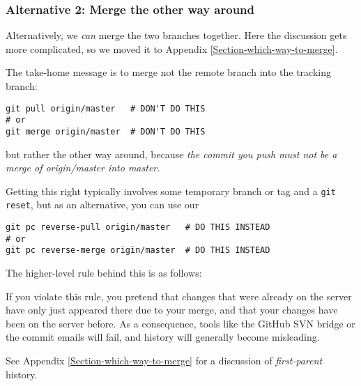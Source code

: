 \documentclass[12pt,pdftex]{article}
\begin{document}
\subsubsection{Alternative 2: Merge the other way around}
\label{sec-5-1-2}

Alternatively, we \emph{can} merge the two branches together.
Here the discussion gets more complicated, so we moved it
to Appendix \ref{Section-which-way-to-merge}.

The take-home message is to merge not the remote branch into the
tracking branch:
\lstset{frame=single,basicstyle=\ttfamily\footnotesize,language=sh,label= ,caption= ,captionpos=b,numbers=none}
\begin{lstlisting}
git pull origin/master   # DON'T DO THIS
# or
git merge origin/master  # DON'T DO THIS
\end{lstlisting}
but rather the other way around, because
\emph{%
the commit you push must not be a merge of \emph{origin/master} into
\emph{master}.
}

Getting this right typically involves some temporary branch or tag and
a \texttt{git reset}, but as an alternative, you can use our
\lstset{frame=single,basicstyle=\ttfamily\footnotesize,language=sh,label= ,caption= ,captionpos=b,numbers=none}
\begin{lstlisting}
git pc reverse-pull origin/master   # DO THIS INSTEAD
# or
git pc reverse-merge origin/master  # DO THIS INSTEAD
\end{lstlisting}

\bigskip

The higher-level rule behind this is as follows:
\begin{quote}
\setlength{\fboxsep}{8pt}
\end{quote}

If you violate this rule, you pretend that changes that were already on
the server have only just appeared there due to your merge, and that
your changes have been on the server before.
As a consequence, tools like the GitHub SVN bridge or the commit emails
will fail, and history will generally become misleading.

See Appendix \ref{Section-which-way-to-merge} for a discussion of
\emph{first-parent} history.
\end{document}
